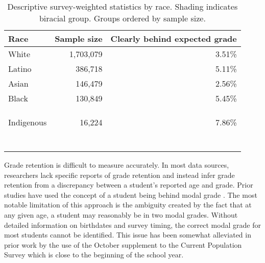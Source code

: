 \documentclass[
  12pt,
  letterpaper,
]{article}
\begin{document}
\hypertarget{tbl-descriptive}{}
\begin{table}
\caption{\label{tbl-descriptive}Descriptive survey-weighted statistics by race. Shading indicates
biracial group. Groups ordered by sample size. }\tabularnewline

\centering
\begin{tabular}[t]{lrr}
\toprule
Race & Sample size & Clearly behind expected grade\\
\midrule
White & 1,703,079 & 3.51\%\\
Latino & 386,718 & 5.11\%\\
Asian & 146,479 & 2.56\%\\
Black & 130,849 & 5.45\%\\
\cellcolor[HTML]{D3D3D3}{White/Latino} & \cellcolor[HTML]{D3D3D3}{120,369} & \cellcolor[HTML]{D3D3D3}{3.13\%}\\
\cellcolor[HTML]{D3D3D3}{White/Asian} & \cellcolor[HTML]{D3D3D3}{38,014} & \cellcolor[HTML]{D3D3D3}{1.82\%}\\
\cellcolor[HTML]{D3D3D3}{Black/White} & \cellcolor[HTML]{D3D3D3}{26,829} & \cellcolor[HTML]{D3D3D3}{3.86\%}\\
Indigenous & 16,224 & 7.86\%\\
\cellcolor[HTML]{D3D3D3}{White/Indigenous} & \cellcolor[HTML]{D3D3D3}{13,689} & \cellcolor[HTML]{D3D3D3}{5.25\%}\\
\cellcolor[HTML]{D3D3D3}{Black/Latino} & \cellcolor[HTML]{D3D3D3}{9,578} & \cellcolor[HTML]{D3D3D3}{3.93\%}\\
\cellcolor[HTML]{D3D3D3}{Latino/Asian} & \cellcolor[HTML]{D3D3D3}{5,570} & \cellcolor[HTML]{D3D3D3}{2.43\%}\\
\cellcolor[HTML]{D3D3D3}{Indigenous/Latino} & \cellcolor[HTML]{D3D3D3}{2,627} & \cellcolor[HTML]{D3D3D3}{5.25\%}\\
\cellcolor[HTML]{D3D3D3}{Black/Asian} & \cellcolor[HTML]{D3D3D3}{2,084} & \cellcolor[HTML]{D3D3D3}{2.98\%}\\
\cellcolor[HTML]{D3D3D3}{Black/Indigenous} & \cellcolor[HTML]{D3D3D3}{701} & \cellcolor[HTML]{D3D3D3}{5.96\%}\\
\cellcolor[HTML]{D3D3D3}{Indigenous/Asian} & \cellcolor[HTML]{D3D3D3}{521} & \cellcolor[HTML]{D3D3D3}{2.60\%}\\
\bottomrule
\end{tabular}
\end{table}

Grade retention is difficult to measure accurately. In most data
sources, researchers lack specific reports of grade retention and
instead infer grade retention from a discrepancy between a student's
reported age and grade. Prior studies have used the concept of a student
being behind modal grade
\autocite{bianchi_children_1984,frederick_have_2008}. The most notable
limitation of this approach is the ambiguity created by the fact that at
any given age, a student may reasonably be in two modal grades. Without
detailed information on birthdates and survey timing, the correct modal
grade for most students cannot be identified. This issue has been
somewhat alleviated in prior work by the use of the October supplement
to the Current Population Survey which is close to the beginning of the
school year.
\end{document}
